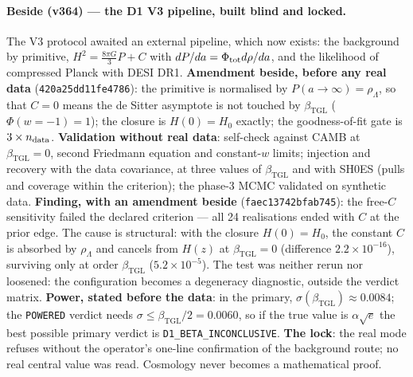\documentclass[11pt]{article}
\newcommand{\bTGL}{\beta_{\mathrm{TGL}}}\newcommand{\Msun}{M_{\odot}}\newcommand{\TGL}{\mathrm{TGL}}
\theoremstyle{definition}\newtheorem{deriv}{Derivation}
\begin{document}
\paragraph*{Beside (v364) --- the D1 V3 pipeline, built blind and locked.} The V3 protocol awaited an external pipeline, which now exists: the background by primitive, $H^2=\tfrac{8\pi G}{3}P+C$ with $dP/da=\Phi_{\rm tot}d\rho/da$, and the likelihood of compressed Planck with DESI DR1. \textbf{Amendment beside, before any real data} (\texttt{420a25dd11fe4786}): the primitive is normalised by $P(a\to\infty)=\rho_\Lambda$, so that $C=0$ means the de Sitter asymptote is not touched by $\bTGL$ ($\Phi(w=-1)=1$); the closure is $H(0)=H_0$ exactly; the goodness-of-fit gate is $3\times n_{\rm data}$. \textbf{Validation without real data}: self-check against CAMB at $\bTGL=0$, second Friedmann equation and constant-$w$ limits; injection and recovery with the data covariance, at three values of $\bTGL$ and with SH0ES (pulls and coverage within the criterion); the phase-3 MCMC validated on synthetic data. \textbf{Finding, with an amendment beside} (\texttt{faec13742bfab745}): the free-$C$ sensitivity failed the declared criterion --- all 24 realisations ended with $C$ at the prior edge. The cause is structural: with the closure $H(0)=H_0$, the constant $C$ is absorbed by $\rho_\Lambda$ and cancels from $H(z)$ at $\bTGL=0$ (difference $2.2\times10^{-16}$), surviving only at order $\bTGL$ ($5.2\times10^{-5}$). The test was neither rerun nor loosened: the configuration becomes a degeneracy diagnostic, outside the verdict matrix. \textbf{Power, stated before the data}: in the primary, $\sigma(\bTGL)\approx0.0084$; the \texttt{POWERED} verdict needs $\sigma\le\bTGL/2=0.0060$, so if the true value is $\alpha\sqrt e$ the best possible primary verdict is \texttt{D1\_BETA\_INCONCLUSIVE}. \textbf{The lock}: the real mode refuses without the operator's one-line confirmation of the background route; no real central value was read. Cosmology never becomes a mathematical proof.
\end{document}
